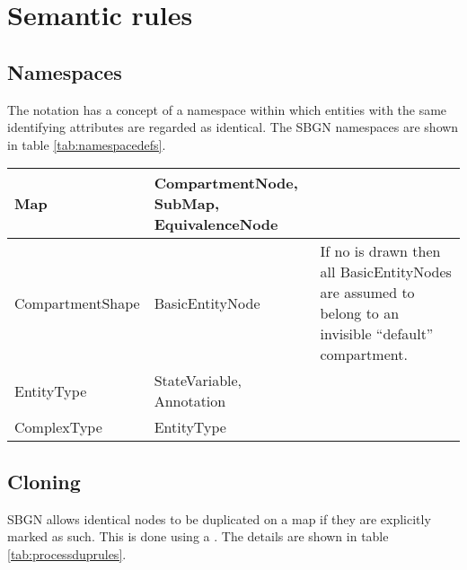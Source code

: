 \section{Semantic rules}

\subsection{Namespaces}

The notation has a concept of a namespace within which entities with the same 
identifying attributes are regarded as identical. The SBGN namespaces are shown 
in table \ref{tab:namespacedefs}.


\begin{center}
\label{tab:namespacedefs}
\begin{small}
\tablelasttail{\hline}
\begin{supertabular}{|l|p{5cm}|p{5cm}|}\hline
%
Map & CompartmentNode, SubMap, EquivalenceNode & \\\hline
%
CompartmentShape & BasicEntityNode & If no  is drawn then all BasicEntityNodes are assumed to belong to an invisible ``default'' compartment.\\\hline
EntityType & StateVariable, Annotation & \\\hline
ComplexType & EntityType & \\\hline
\end{supertabular}
\end{small}
\end{center}

\subsection{Cloning}

SBGN allows identical nodes to be duplicated on a map if they are
explicitly marked as such. This is done using a . The details are shown in table \ref{tab:processduprules}.


